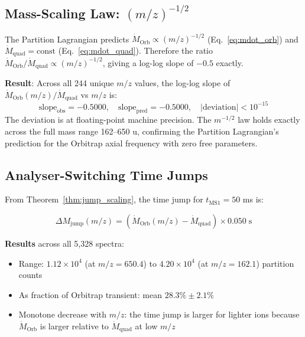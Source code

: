 \documentclass[11pt,twocolumn,a4paper]{article}
\theoremstyle{plain}
\theoremstyle{definition}
\theoremstyle{remark}
\begin{document}
\subsection{Mass-Scaling Law: $(m/z)^{-1/2}$}
\label{subsec:scaling_law}

The Partition Lagrangian predicts $\dot{M}_{\mathrm{Orb}} \propto (m/z)^{-1/2}$
(Eq.~\eqref{eq:mdot_orb}) and $\dot{M}_{\mathrm{quad}} = \mathrm{const}$
(Eq.~\eqref{eq:mdot_quad}). Therefore the ratio $\dot{M}_{\mathrm{Orb}}/
\dot{M}_{\mathrm{quad}} \propto (m/z)^{-1/2}$, giving a log-log slope of
$-0.5$ exactly.

\textbf{Result}: Across all 244 unique $m/z$ values, the log-log slope of
$\dot{M}_{\mathrm{Orb}}(m/z)/\dot{M}_{\mathrm{quad}}$ vs $m/z$ is:
\begin{equation}
    \mathrm{slope}_{\mathrm{obs}} = -0.5000, \quad
    \mathrm{slope}_{\mathrm{pred}} = -0.5000, \quad
    |\mathrm{deviation}| < 10^{-15}
    \label{eq:slope_result}
\end{equation}
The deviation is at floating-point machine precision. The $m^{-1/2}$ law holds
exactly across the full mass range 162--650 u, confirming the Partition
Lagrangian's prediction for the Orbitrap axial frequency with zero free
parameters.

\subsection{Analyser-Switching Time Jumps}
\label{subsec:jump_results}

From Theorem~\ref{thm:jump_scaling}, the time jump for $t_{\mathrm{MS1}} = 50$
ms is:

\begin{equation}
    \Delta M_{\mathrm{jump}}(m/z) = \left(\dot{M}_{\mathrm{Orb}}(m/z) -
    \dot{M}_{\mathrm{quad}}\right) \times 0.050 \;\mathrm{s}
    \label{eq:jump_result}
\end{equation}

\textbf{Results} across all 5,328 spectra:
\begin{itemize}
    \item Range: $1.12 \times 10^4$ (at $m/z = 650.4$) to $4.20 \times 10^4$
          (at $m/z = 162.1$) partition counts
    \item As fraction of Orbitrap transient: mean $28.3\% \pm 2.1\%$
    \item Monotone decrease with $m/z$: the time jump is larger for lighter ions
          because $\dot{M}_{\mathrm{Orb}}$ is larger relative to
          $\dot{M}_{\mathrm{quad}}$ at low $m/z$
\end{itemize}
\end{document}
